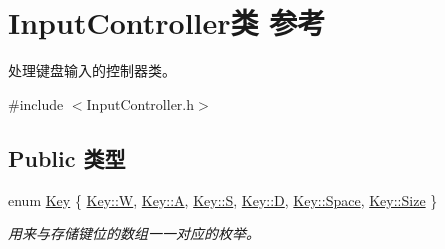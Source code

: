 \hypertarget{class_input_controller}{}\section{Input\+Controller类 参考}
\label{class_input_controller}


处理键盘输入的控制器类。  




{\ttfamily \#include $<$Input\+Controller.\+h$>$}

\subsection*{Public 类型}
\begin{DoxyCompactItemize}
\item 
enum \hyperlink{class_input_controller_a840a7425e2220e1ef5659a7ea4ba122d}{Key} \{ \newline
\hyperlink{class_input_controller_a840a7425e2220e1ef5659a7ea4ba122da61e9c06ea9a85a5088a499df6458d276}{Key\+::W}, 
\hyperlink{class_input_controller_a840a7425e2220e1ef5659a7ea4ba122da7fc56270e7a70fa81a5935b72eacbe29}{Key\+::A}, 
\hyperlink{class_input_controller_a840a7425e2220e1ef5659a7ea4ba122da5dbc98dcc983a70728bd082d1a47546e}{Key\+::S}, 
\hyperlink{class_input_controller_a840a7425e2220e1ef5659a7ea4ba122daf623e75af30e62bbd73d6df5b50bb7b5}{Key\+::D}, 
\newline
\hyperlink{class_input_controller_a840a7425e2220e1ef5659a7ea4ba122dad511f8439ecde36647437fbba67a4394}{Key\+::\+Space}, 
\hyperlink{class_input_controller_a840a7425e2220e1ef5659a7ea4ba122da6f6cb72d544962fa333e2e34ce64f719}{Key\+::\+Size}
 \}\begin{DoxyCompactList}\small\item\em 用来与存储键位的数组一一对应的枚举。 \end{DoxyCompactList}
\end{DoxyCompactItemize}
